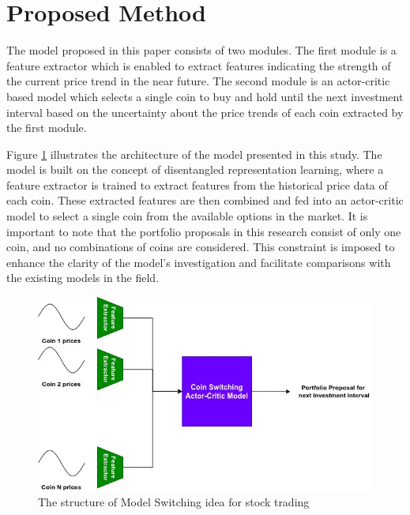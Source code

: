 \section{Proposed Method}
The model proposed in this paper consists of two modules. The first module is a feature extractor which is enabled to extract features indicating the strength of the current price trend in the near future. The second module is an actor-critic based model which selects a single coin to buy and hold until the next investment interval based on the uncertainty about the price trends of each coin extracted by the first module. 

Figure \ref{fig:arch} illustrates the architecture of the model presented in this study. The model is built on the concept of disentangled representation learning, where a feature extractor is trained to extract features from the historical price data of each coin. These extracted features are then combined and fed into an actor-critic model to select a single coin from the available options in the market. It is important to note that the portfolio proposals in this research consist of only one coin, and no combinations of coins are considered. This constraint is imposed to enhance the clarity of the model's investigation and facilitate comparisons with the existing models in the field.



\begin{figure}[H]
	\centering
	\includegraphics[scale=0.4]{./arch.jpg}
	\caption{The structure of Model Switching idea for stock trading}
	\label{fig:arch}
\end{figure}


